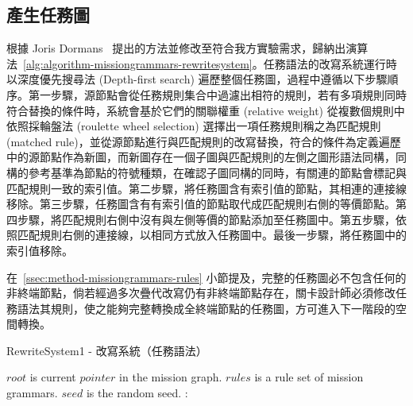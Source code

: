\subsection{產生任務圖}
\label{ssec:method-missiongrammars-graph}

根據 Joris Dormans~\cite{dormans2010adventures} 提出的方法並修改至符合我方實驗需求，歸納出演算法~\ref{alg:algorithm-missiongrammars-rewritesystem}。任務語法的改寫系統運行時以深度優先搜尋法 (Depth-first search) 遍歷整個任務圖，過程中遵循以下步驟順序。第一步驟，源節點會從任務規則集合中過濾出相符的規則，若有多項規則同時符合替換的條件時，系統會基於它們的關聯權重 (relative weight) 從複數個規則中依照採輪盤法 (roulette wheel selection) 選擇出一項任務規則稱之為匹配規則 (matched rule)，並從源節點進行與匹配規則的改寫替換，符合的條件為定義遍歷中的源節點作為新圖，而新圖存在一個子圖與匹配規則的左側之圖形語法同構，同構的參考基準為節點的符號種類，在確認子圖同構的同時，有關連的節點會標記與匹配規則一致的索引值。第二步驟，將任務圖含有索引值的節點，其相連的連接線移除。第三步驟，任務圖含有有索引值的節點取代成匹配規則右側的等價節點。第四步驟，將匹配規則右側中沒有與左側等價的節點添加至任務圖中。第五步驟，依照匹配規則右側的連接線，以相同方式放入任務圖中。最後一步驟，將任務圖中的索引值移除。

在~\ref{ssec:method-missiongrammars-rules} 小節提及，完整的任務圖必不包含任何的非終端節點，倘若經過多次疊代改寫仍有非終端節點存在，關卡設計師必須修改任務語法其規則，使之能夠完整轉換成全終端節點的任務圖，方可進入下一階段的空間轉換。

\begin{algorithm}[ht]
    \caption{RewriteSystem1 - 改寫系統（任務語法）}
    \label{alg:algorithm-missiongrammars-rewritesystem}
    \begin{algorithmic}[1]
        \Require
            \Statex $root$ is current $pointer$ in the mission graph.
            \Statex $rules$ is a rule set of mission grammars.
            \Statex $seed$ is the random seed.
        \Ensure
            \EndIf
            :
            \EndFor \\
        \Statex
    \end{algorithmic}
\end{algorithm}


